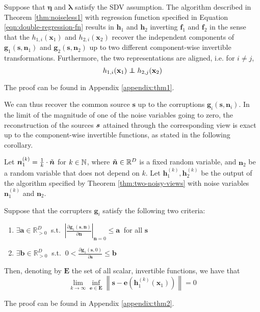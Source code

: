 \medskip

\begin{theorem}\label{thm:two-noisy-views}
	Suppose that $\bm{\eta}$ and $\bm{\lambda}$ satisfy the SDV assumption.
	The algorithm described in Theorem \ref{thm:noiseless1} with regression function specified in Equation \ref{eqn:double-regression-fn} results in $\bm{h}_1$ and $\bm{h}_2$ inverting $\bm{f}_1$ and $\bm{f}_2$ in the sense that the $h_{1,i}(\bm{x}_1)$ and $h_{2,i}(\bm{x}_2)$ recover the independent components of $\bm{g}_1(\bm{s}, \bm{n}_1)$ and $\bm{g}_2(\bm{s}, \bm{n}_2)$ up to two different component-wise invertible transformations. Furthermore, the two representations are aligned, i.e. for $i\not=j$,
	\begin{equation*}
	h_{1,i}(\mathbf{x}_{1})\independent h_{2,j}(\mathbf{x}_{2})
	\end{equation*}
\end{theorem}
The proof can be found in Appendix \ref{appendix:thm1}.




We can thus recover the common source $\bm{s}$ up to the corruptions $\bm{g}_i(\bm{s}, \bm{n}_i)$.
In the limit of the magnitude of one of the noise variables going to zero, the reconstruction of the sources ${\bm{s}}$ attained through the corresponding view is exact up to the component-wise invertible functions, as stated in the following corollary.

\medskip

\begin{corollary}
	\label{crl:lownoise}
	Let $\bm{n}_1^{(k)} = \frac{1}{k} \cdot  \Tilde{\bm{n}}$ for $k \in \mathbb{N}$, where $\Tilde{\bm{n}}\in\mathbb{R}^D$ is a fixed random variable, and $\bm{n}_2$ be a random variable that does not depend on $k$.
	Let $\bm{h}_1^{(k)}, \bm{h}_2^{(k)}$ be the output of the algorithm specified by Theorem \ref{thm:two-noisy-views} with noise variables $\bm{n}_1^{(k)}$ and $\bm{n}_2$.
	
	Suppose that the corrupters $\bm{g}_i$ satisfy the following two criteria:
	\begin{enumerate}
		\item $\exists \bm{a}  \in \mathbb{R}_{> 0}^D \: $   s.t. $\: \left|\frac{\partial \bm{g}_1(\bm{s},\bm{n})}{\partial \bm{n}} \right|_{\bm{n}=0} \leq \bm{a} \: $ for all $\bm{s}$
		\item $\exists \bm{b}  \in \mathbb{R}_{> 0}^D \: $ s.t. $\: 0<\frac{\partial \bm{g}_1(\bm{s},0)}{\partial \bm{s}} \leq \bm{b}$
	\end{enumerate}
	Then, denoting by $\bm{E}$ the set of all scalar, invertible functions, we have that
	\[
	\lim_{k \to \infty} \inf_{\bm{e}\in \bm{E}} \left \|\bm{s} - \bm{e}(\bm{h}_1^{(k)}(\bm{x}_1)) \right \| = 0
	\]
\end{corollary}
The proof can be found in Appendix \ref{appendix:thm2}.

